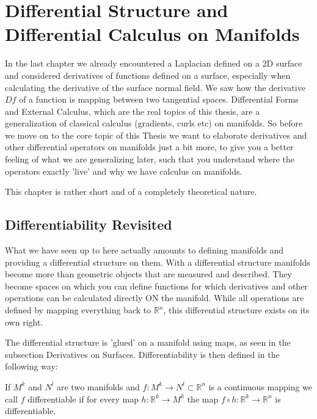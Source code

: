 \chapter{Differential Structure and Differential Calculus on Manifolds}

In the last chapter we already encountered a Laplacian defined on a 2D surface and considered derivatives of functions defined on a surface, especially when calculating the derivative of the surface normal field. We saw how the derivative $Df$ of a function is mapping between two tangential spaces. Differential Forms and External Calculus, which are the real topics of this thesis, are a generalization of classical calculus (gradients, curls etc) on manifolds.  So before we move on to the core topic of this Thesis we want to elaborate derivatives and other differential operators on manifolds just a bit more, to give you a better feeling of what we are generalizing later, such that you understand where the operators exactly 'live' and why we have calculus on manifolds.

This chapter is rather short and of a completely theoretical nature.

\section{Differentiability Revisited}
What we have seen up to here actually amounts to defining manifolds and providing a differential structure on them. With a differential structure manifolds become more than geometric objects that are measured and described. They become spaces on which you can define functions for which derivatives and other operations can be calculated directly ON the manifold. While all operations are defined by mapping everything back to $\mathbb R^n$, this differential structure exists on its own right.

The differential structure is 'glued' on a manifold using maps, as seen in the subsection Derivatives on Surfaces. Differentiability is then defined in the following way:

\begin{definition}[Differentiability] If $M^k$ and $N^l$ are two manifolds and $f: M^k \rightarrow N^l \subset \mathbb R^n$ is a continuous mapping we call $f$ differentiable if for every map $h:\mathbb R^k \rightarrow M^k$ the map $f \circ h :  \mathbb R^k \rightarrow \mathbb R^n$ is differentiable.
\end{definition}

